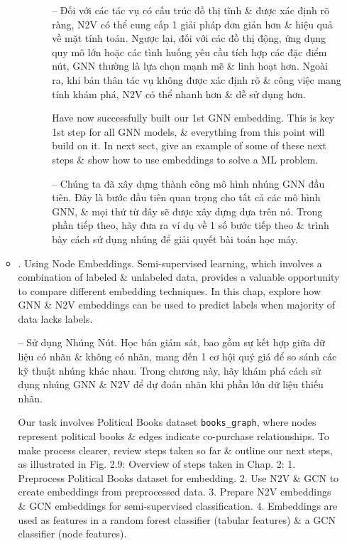 \documentclass{article}
\begin{document}
\begin{itemize}
\begin{itemize}
\begin{itemize}
\begin{itemize}
               -- Đối với các tác vụ có cấu trúc đồ thị tĩnh \& được xác định rõ ràng, N2V có thể cung cấp 1 giải pháp đơn giản hơn \& hiệu quả về mặt tính toán. Ngược lại, đối với các đồ thị động, ứng dụng quy mô lớn hoặc các tình huống yêu cầu tích hợp các đặc điểm nút, GNN thường là lựa chọn mạnh mẽ \& linh hoạt hơn. Ngoài ra, khi bản thân tác vụ không được xác định rõ \& công việc mang tính khám phá, N2V có thể nhanh hơn \& dễ sử dụng hơn.

               Have now successfully built our 1st GNN embedding. This is key 1st step for all GNN models, \& everything from this point will build on it. In next sect, give an example of some of these next steps \& show how to use embeddings to solve a ML problem.

               -- Chúng ta đã xây dựng thành công mô hình nhúng GNN đầu tiên. Đây là bước đầu tiên quan trọng cho tất cả các mô hình GNN, \& mọi thứ từ đây sẽ được xây dựng dựa trên nó. Trong phần tiếp theo, hãy đưa ra ví dụ về 1 số bước tiếp theo \& trình bày cách sử dụng nhúng để giải quyết bài toán học máy.
           \end{itemize}
       \end{itemize}
       \item {. Using Node Embeddings.} Semi-supervised learning, which involves a combination of labeled \& unlabeled data, provides a valuable opportunity to compare different embedding techniques. In this chap, explore how GNN \& N2V embeddings can be used to predict labels when majority of data lacks labels.

       -- {\sf Sử dụng Nhúng Nút.} Học bán giám sát, bao gồm sự kết hợp giữa dữ liệu có nhãn \& không có nhãn, mang đến 1 cơ hội quý giá để so sánh các kỹ thuật nhúng khác nhau. Trong chương này, hãy khám phá cách sử dụng nhúng GNN \& N2V để dự đoán nhãn khi phần lớn dữ liệu thiếu nhãn.

       Our task involves Political Books dataset \verb|books_graph|, where nodes represent political books \& edges indicate co-purchase relationships. To make process clearer, review steps taken so far \& outline our next steps, as illustrated in {\sf Fig. 2.9: Overview of steps taken in Chap. 2: 1. Preprocess Political Books dataset for embedding. 2. Use N2V \& GCN to create embeddings from preprocessed data. 3. Prepare N2V embeddings \& GCN embeddings for semi-supervised classification. 4. Embeddings are used as features in a random forest classifier (tabular features) \& a GCN classifier (node features).}


\end{itemize}
\end{itemize}
\end{document}
